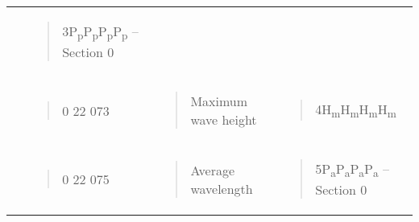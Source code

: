 \begin{longtable}[]{@{}llll@{}}
\begin{minipage}[t]{0.22\columnwidth}
\end{minipage} & \begin{minipage}[t]{0.22\columnwidth}\raggedright
\begin{quote}
3P\textsubscript{p}P\textsubscript{p}P\textsubscript{p}P\textsubscript{p} -- Section 0
\end{quote}\strut
\end{minipage}\tabularnewline
\begin{minipage}[t]{0.22\columnwidth}\raggedright
\strut
\end{minipage} & \begin{minipage}[t]{0.22\columnwidth}\raggedright
\begin{quote}
0 22 073
\end{quote}\strut
\end{minipage} & \begin{minipage}[t]{0.22\columnwidth}\raggedright
\begin{quote}
Maximum wave height
\end{quote}\strut
\end{minipage} & \begin{minipage}[t]{0.22\columnwidth}\raggedright
\begin{quote}
4H\textsubscript{m}H\textsubscript{m}H\textsubscript{m}H\textsubscript{m}
\end{quote}\strut
\end{minipage}\tabularnewline
\begin{minipage}[t]{0.22\columnwidth}\raggedright
\strut
\end{minipage} & \begin{minipage}[t]{0.22\columnwidth}\raggedright
\begin{quote}
0 22 075
\end{quote}\strut
\end{minipage} & \begin{minipage}[t]{0.22\columnwidth}\raggedright
\begin{quote}
Average wavelength
\end{quote}\strut
\end{minipage} & \begin{minipage}[t]{0.22\columnwidth}\raggedright
\begin{quote}
5P\textsubscript{a}P\textsubscript{a}P\textsubscript{a}P\textsubscript{a} -- Section 0
\end{quote}\strut
\end{minipage}\tabularnewline
\bottomrule
\end{longtable}


